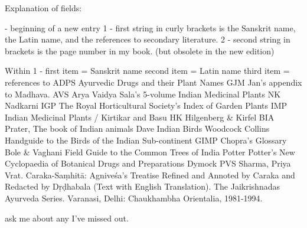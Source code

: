 Explanation of fields:

\indexentry - 	beginning of a new entry
{1} -			first string in curly brackets is the Sanskrit name, the Latin name, and the references to secondary literature.
{2} - 			second string in brackets is the page number in my book.  (but obsolete in the new edition)

Within {1} - 	first item = Sanskrit name
				second item = Latin name
				third item = references to 
					ADPS 	Ayurvedic Drugs and their Plant Names
					GJM		Jan's appendix to Madhava.
					AVS		Arya Vaidya Sala's 5-volume Indian Medicinal Plants
					NK 		Nadkarni
					IGP 	The Royal Horticultural Society's Index of Garden Plants
					IMP		Indian Medicinal Plants / Kirtikar and Basu
					HK		Hilgenberg & Kirfel
					BIA		Prater, The book of Indian animals
					Dave 	Indian Birds
					Woodcock Collins Handguide to the Birds of the Indian Sub-continent	
					GIMP	Chopra's Glossary
					Bole & Vaghani	Field Guide to the Common Trees of India
					Potter	Potter's New Cyclopaedia of Botanical Drugs and Preparations
					Dymock
                    PVS	  Sharma, Priya Vrat. Caraka-Saṃhitā: Agniveśa’s Treatise Refined 
                    and Annoted by Caraka and Redacted by Dṛḍhabala (Text with English 
                    Translation). The Jaikrishnadas Ayurveda Series. Varanasi, Delhi: 
                    Chaukhambha Orientalia, 1981-1994.
                    

					ask me about any I've missed out.
 

